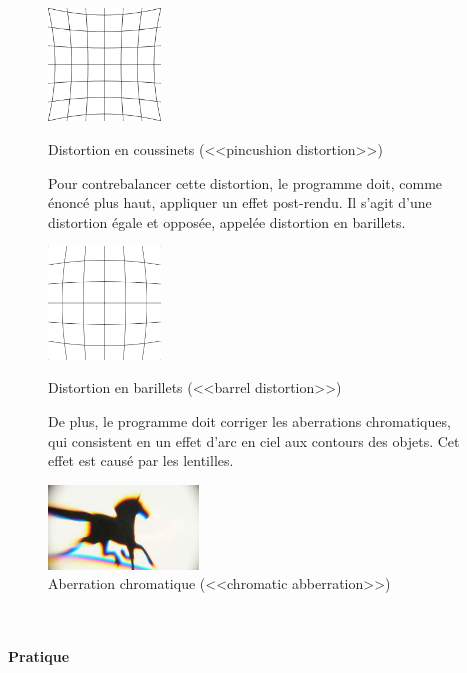\documentclass[a4paper,french,12pt]{article}
\begin{document}
			     \begin{figure}[h!]
			      \centering
				\includegraphics[width=3cm]{pincushion_distortion.png}
			      \caption{Distortion en coussinets (<<pincushion distortion>>)}\par\medskip
			    

			    Pour contrebalancer cette distortion, le programme doit, comme énoncé plus haut, appliquer
			    un effet post-rendu. Il s'agit d'une distortion égale et opposée, appelée distortion en 
			    barillets.\par\bigskip
			    
			     {
			      \centering
				\includegraphics[width=3cm]{barrel_distortion.png}
			      \caption{Distortion en barillets (<<barrel distortion>>)}
			     }\par\medskip
			    
			    De plus, le programme doit corriger les aberrations chromatiques, qui consistent en un effet
			    d'arc en ciel aux contours des objets. Cet effet est causé par les lentilles.\par\bigskip
			    
			   {
			      \centering
				\includegraphics[width=4cm]{chromatic_aberration.jpg}
			      \caption{Aberration chromatique (<<chromatic abberration>>)}
			   }
			    \end{figure}  ~ \\
			    
			    
			\paragraph{Pratique} ~\\
			
\end{document}
